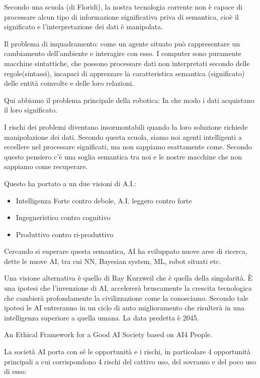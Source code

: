 \documentclass[]{article}
\begin{document}
Secondo una scuola (di Floridi), la nostra tecnologia corrente non è
capace di processare alcun tipo di informazione significativa priva di
semantica, cioè il significato e l'interpretazione dei dati è
manipolata.

Il problema di inquadramento: come un agente situato può rappresentare
un cambiamento dell'ambiente e interagire con esso. I computer sono
puramente macchine sintattiche, che possono processare dati non
interpretati secondo delle regole(sintassi), incapaci di apprezzare la
caratteristica semantica (significato) delle entità coinvolte e delle
loro relazioni.

Qui abbiamo il problema principale della robotica: In che modo i dati
acquistano il loro significato.

I rischi dei problemi diventano insormontabili quando la loro soluzione
richiede manipolazione dei dati. Secondo questa scuola, siamo noi agenti
intelligenti a eccellere nel processare significati, ma non sappiamo
esattamente come. Secondo questo pensiero c'è una soglia semantica tra
noi e le nostre macchine che non sappiamo come recuperare.

Questo ha portato a un due visioni di A.I.:

\begin{itemize}
	 
	\item
	Intelligenza Forte contro debole, A.I. leggero contro forte
	\item
	Ingegneristico contro cognitivo
	\item
	Produttivo contro ri-produttivo
\end{itemize}

Cercando si superare questa semantica, AI ha sviluppato nuove aree di
ricerca, dette le nuove AI, tra cui NN, Bayesian system, ML, robot
situati etc.

Una visione alternativa è quello di Ray Kurzweil che è quella della
singolarità. È una ipotesi che l'invenzione di AI, accelererà
bruscamente la crescita tecnologica che cambierà profondamente la
civilizzazione come la conosciamo. Secondo tale ipotesi le AI entreranno
in un ciclo di auto miglioramento che risulterà in una intelligenza
superiore a quella umana. La data predetta è 2045.

An Ethical Framework for a Good AI Society based on AI4 People.

La società AI porta con sé le opportunità e i rischi, in particolare 4
opportunità principali a cui corrispondono 4 rischi del cattivo uso, del
sovrauso e del poco uso di esso:
\end{document}

